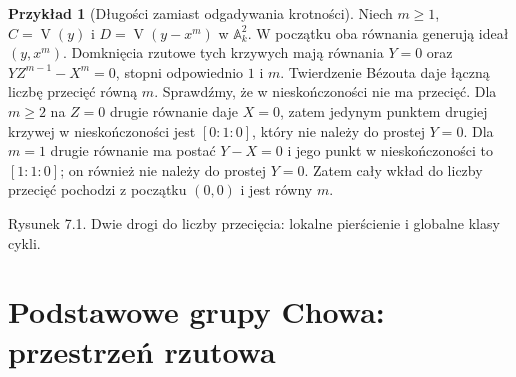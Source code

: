 \documentclass[11pt,a4paper,openany]{report}
\numberwithin{equation}{section}
\theoremstyle{plain}
\theoremstyle{definition}
\newtheorem{przyklad}[twierdzenie]{Przykład}
\theoremstyle{remark}
\newcommand{\A}{\mathbb A}
\newcommand{\V}{\operatorname V}
\begin{document}
\begin{przyklad}[Długości zamiast odgadywania krotności]
Niech $m\ge1$, $C=\V(y)$ i $D=\V(y-x^m)$ w $\A^2_k$.
W początku oba równania generują ideał $(y,x^m)$.
Domknięcia rzutowe tych krzywych mają równania
$Y=0$ oraz $YZ^{m-1}-X^m=0$, stopni odpowiednio
$1$ i $m$. Twierdzenie Bézouta daje łączną liczbę
przecięć równą $m$.
Sprawdźmy, że w nieskończoności nie ma przecięć.
Dla $m\ge2$ na $Z=0$ drugie równanie daje $X=0$,
zatem jedynym punktem drugiej krzywej w nieskończoności
jest $[0:1:0]$, który nie należy do prostej $Y=0$.
Dla $m=1$ drugie równanie ma postać $Y-X=0$
i jego punkt w nieskończoności to $[1:1:0]$;
on również nie należy do prostej $Y=0$.
Zatem cały wkład do liczby przecięć pochodzi
z początku $(0,0)$ i jest równy $m$.
\end{przyklad}

\begin{center}
\begin{minipage}{\linewidth}
\centering
{}

{\small Rysunek 7.1. Dwie drogi do liczby przecięcia: lokalne pierścienie i globalne klasy cykli.}
\end{minipage}
\end{center}

\section{Podstawowe grupy Chowa: przestrzeń rzutowa}
\label{sec:ga7-projective-chow}
\end{document}
